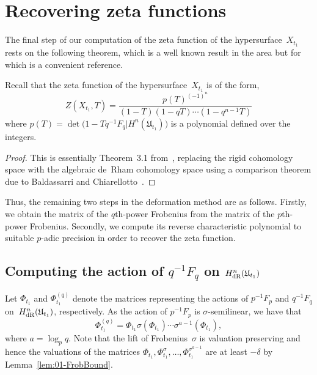 \section{Recovering zeta functions}

The final step of our computation of the zeta function of the 
hypersurface~$X_{t_1}$ rests on the following theorem, which 
is a well known result in the area but for which 
\citep[Theorem~3.1]{Gerkmann2007} is a convenient reference.

\begin{thm}
Recall that the zeta function of the hypersurface~$X_{t_1}$ is of the form,
\begin{equation*}
Z(X_{t_1},T) = \frac{p(T)^{(-1)^n}}{(1 - T) (1 - qT) \dotsm (1 - q^{n-1}T)}
\end{equation*}
where $p(T) = \det \bigl( 1 - T q^{-1} F_q | H^n(\mathfrak{U}_{t_1}) \bigr)$ 
is a polynomial defined over the integers.
\end{thm}

\begin{proof}
This is essentially {Theorem~3.1} from~\citep{Gerkmann2007}, 
replacing the rigid cohomology space with the algebraic de~Rham 
cohomology space using a comparison theorem due to Baldassarri 
and Chiarellotto~\citep{BalChi94}.
\end{proof}

Thus, the remaining two steps in the deformation method are as follows.  
Firstly, we obtain the matrix of the $q$th-power Frobenius from the matrix of 
the $p$th-power Frobenius.  Secondly, we compute its reverse characteristic 
polynomial to suitable $p$-adic precision in order to recover the zeta 
function.

\subsection{Computing the action of $q^{-1} F_q$ on $H_{\text{dR}}^{n}(\mathfrak{U}_{t_1})$}

Let $\Phi_{t_1}$ and $\Phi_{t_1}^{(q)}$ denote the matrices representing the 
actions of $p^{-1} F_p$ and $q^{-1} F_q$ on~$H_{\text{dR}}^{n}(\mathfrak{U}_{t_1})$, 
respectively.  As the action of $p^{-1} F_p$ is $\sigma$-semilinear, we have 
that 
\begin{equation*}
\Phi_{t_1}^{(q)} = 
    \Phi_{t_1} \sigma(\Phi_{t_1}) \dotsm \sigma^{a-1}(\Phi_{t_1}),
\end{equation*}
where $a = \log_p q$.  Note that the lift of Frobenius~$\sigma$ 
is valuation preserving and hence the valuations of the matrices 
$\Phi_{t_1}, \Phi_{t_1}^{\sigma}, \dotsc, \Phi_{t_1}^{\sigma^{a-1}}$ 
are at least $-\delta$ by Lemma~\ref{lem:01-FrobBound}.

